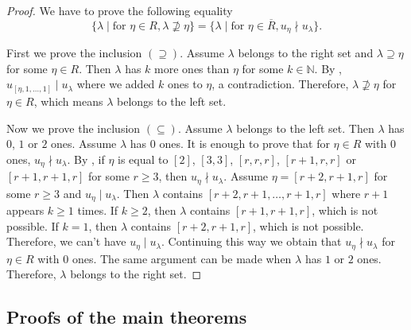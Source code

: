 \documentclass[a4paper, 12pt, reqno]{amsart}
\theoremstyle{remark}
\numberwithin{equation}{subsection}
\begin{document}
\begin{proof}
  We have to prove the following equality
  \begin{equation*}
    \{\lambda \mid \text{for }\eta \in R, \lambda \nsupseteq \eta\} = \{\lambda \mid \text{for }\eta \in \overline{R}, u_{\eta} \nmid u_{\lambda}\}.
  \end{equation*}

  First we prove the inclusion $(\supseteq)$.
  Assume $\lambda$ belongs to the right set and $\lambda \supseteq \eta$ for some $\eta \in R$.
  Then $\lambda$ has $k$ more ones than $\eta$ for some $k \in \mathbb{N}$.
  By , $u_{[\eta, 1, \dots, 1]} \mid u_{\lambda}$ where we added $k$ ones to $\eta$, a contradiction.
  Therefore, $\lambda \nsupseteq \eta$ for $\eta \in R$, which means $\lambda$ belongs to the left set.

  Now we prove the inclusion $(\subseteq)$.
  Assume $\lambda$ belongs to the left set.
  Then $\lambda$ has $0$, $1$ or $2$ ones.
  Assume $\lambda$ has $0$ ones.
  It is enough to prove that for $\eta \in R$ with $0$ ones, $u_{\eta} \nmid u_{\lambda}$.
  By , if $\eta$ is equal to $[2]$, $[3, 3]$, $[r, r, r]$, $[r + 1, r, r]$ or $[r + 1, r + 1, r]$ for some $r \ge 3$, then $u_{\eta} \nmid u_{\lambda}$.
  Assume $\eta = [r + 2, r + 1, r]$ for some $r \ge 3$ and $u_{\eta} \mid u_{\lambda}$.
  Then $\lambda$ contains $[r + 2, r + 1, \dots, r + 1, r]$ where $r + 1$ appears $k \ge 1$ times.
  If $k \ge 2$, then $\lambda$ contains $[r + 1, r + 1, r]$, which is not possible.
  If $k = 1$, then $\lambda$ contains $[r + 2, r + 1, r]$, which is not possible.
  Therefore, we can't have $u_{\eta} \mid u_{\lambda}$.
  Continuing this way we obtain that $u_{\eta} \nmid u_{\lambda}$ for $\eta \in R$ with $0$ ones.
  The same argument can be made when $\lambda$ has $1$ or $2$ ones.
  Therefore, $\lambda$ belongs to the right set.
\end{proof}

\subsection{Proofs of the main theorems}
\label{sec:proofs-main-theorems}
\end{document}
